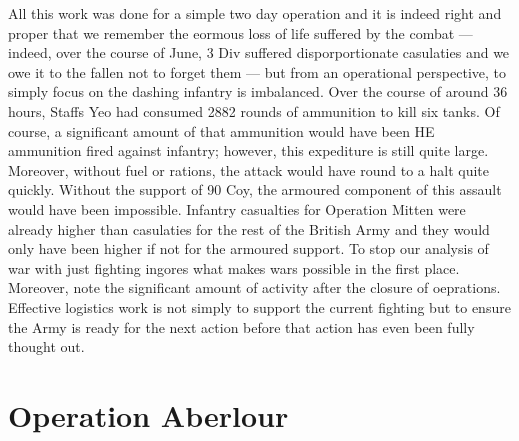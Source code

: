 \documentclass[noraggedright]{turabian-researchpaper}
\begin{document}
All this work was done for a simple two day operation and it is indeed right
and proper that we remember the eormous loss of life suffered by the combat
--- indeed, over the course of June, 3 Div suffered disporportionate 
casulaties and we owe it to the fallen not to forget them --- but from an
operational perspective, to simply focus on the dashing infantry is 
imbalanced.\autocite[112]{assault-div} Over the course of 
around 36 hours, Staffs Yeo had consumed 2882 rounds of ammunition to kill 
six tanks.\autocites[June appendix, Operation Mitten Intelligence Diary, 
Entry 58]{27wd}[on ammunition expediture, 27-8 June 1944]{90wd}  Of course, 
a significant amount of that ammunition would have been HE ammunition fired
against infantry; however, this expediture is still quite large.  Moreover,
without fuel or rations, the attack would have round to a halt quite quickly.
Without the support of 90 Coy, the armoured component of this assault would
have been impossible.  Infantry casualties for Operation Mitten were already
higher than casulaties for the rest of the British Army %
and they would only have been higher if not for the armoured support.  To stop
our analysis of war with just fighting ingores what makes wars possible in the
first place.
Moreover, note the significant amount of activity after the closure of 
oeprations.  Effective logistics work is not simply to support the current 
fighting but to ensure the Army is ready for the next action before that 
action has even been fully thought out.%


\section{Operation Aberlour}

\section{} %
\end{document}
